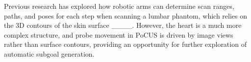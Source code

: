 Previous research has explored how robotic arms can determine scan ranges, paths, and poses for each step when scanning a lumbar phantom, which relies on the 3D contours of the skin surface ____. However, the heart is a much more complex structure, and probe movement in PoCUS is driven by image views rather than surface contours, providing an opportunity for further exploration of automatic subgoal generation.